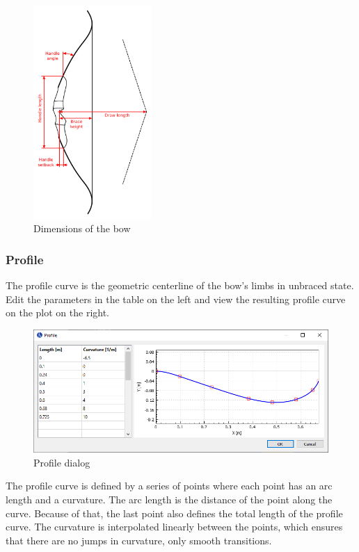 \documentclass[12pt]{article}
\begin{document}
\begin{figure}[H]
\centering
\includegraphics[width=0.4\textwidth]{figures/dimensions}
\caption{Dimensions of the bow}
\label{fig:dimensions-2}
\end{figure}

\newpage
\subsubsection{Profile}

The profile curve is the geometric centerline of the bow's limbs in unbraced state.
Edit the parameters in the table on the left and view the resulting profile curve on the plot on the right.

\bigskip

\begin{figure}[H]
\centering
\includegraphics[width=\textwidth]{figures/screenshots/input/profile}
\caption{Profile dialog}
\label{fig:profile}
\end{figure}

The profile curve is defined by a series of points where each point has an arc length and a curvature.
The arc length is the distance of the point along the curve.
Because of that, the last point also defines the total length of the profile curve.
The curvature is interpolated linearly between the points, which ensures that there are no jumps in curvature, only smooth transitions.
\end{document}
